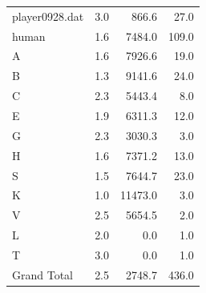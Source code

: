 \begin{table}[htbp]
\begin{tabular}{rrrr}
          \multicolumn{1}{l}{player0928.dat} & 3.0    & 866.6  & 27.0 \\
          \multicolumn{1}{l}{human} & 1.6    & 7484.0 & 109.0 \\
          \hline
          \multicolumn{1}{l}{A} & 1.6    & 7926.6 & 19.0 \\
          \multicolumn{1}{l}{B} & 1.3    & 9141.6 & 24.0 \\
          \multicolumn{1}{l}{C} & 2.3    & 5443.4 & 8.0 \\
          \multicolumn{1}{l}{E} & 1.9    & 6311.3 & 12.0 \\
          \multicolumn{1}{l}{G} & 2.3    & 3030.3 & 3.0 \\
          \multicolumn{1}{l}{H} & 1.6    & 7371.2 & 13.0 \\
          \multicolumn{1}{l}{S} & 1.5    & 7644.7 & 23.0 \\
          \multicolumn{1}{l}{K} & 1.0    & 11473.0 & 3.0 \\
          \multicolumn{1}{l}{V} & 2.5    & 5654.5 & 2.0 \\
          \multicolumn{1}{l}{L} & 2.0    & 0.0    & 1.0 \\
          \multicolumn{1}{l}{T} & 3.0    & 0.0    & 1.0 \\
          \multicolumn{1}{l}{Grand Total} & 2.5    & 2748.7 & 436.0 \\
          \bottomrule
          \end{tabular}%
        \label{tab:addlabel}%
      \end{table}%
